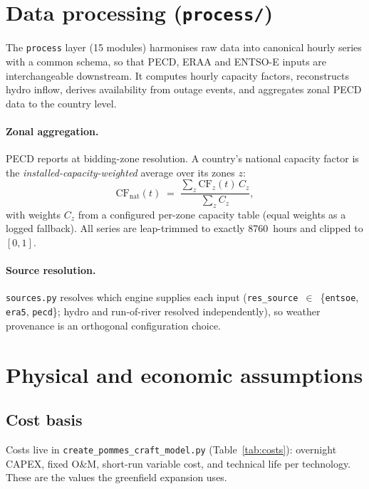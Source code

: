 \documentclass[11pt,a4paper]{article}
\begin{document}
\section{Data processing (\texttt{process/})}
The \texttt{process} layer (15 modules) harmonises raw data into canonical hourly series with a common
schema, so that PECD, ERAA and ENTSO-E inputs are interchangeable downstream. It computes hourly
capacity factors, reconstructs hydro inflow, derives availability from outage events, and aggregates
zonal PECD data to the country level.

\paragraph{Zonal aggregation.} PECD reports at bidding-zone resolution. A country's national capacity
factor is the \emph{installed-capacity-weighted} average over its zones $z$:
\begin{equation}
\mathrm{CF}_{\text{nat}}(t) \;=\; \frac{\sum_z \mathrm{CF}_z(t)\,C_z}{\sum_z C_z},
\label{eq:cf}
\end{equation}
with weights $C_z$ from a configured per-zone capacity table (equal weights as a logged fallback). All
series are leap-trimmed to exactly 8760~hours and clipped to $[0,1]$.

\paragraph{Source resolution.} \texttt{sources.py} resolves which engine supplies each input
(\texttt{res\_source}~$\in$~\{\texttt{entsoe}, \texttt{era5}, \texttt{pecd}\}; hydro and run-of-river
resolved independently), so weather provenance is an orthogonal configuration choice.

\section{Physical and economic assumptions}
\subsection{Cost basis}
Costs live in \texttt{create\_pommes\_craft\_model.py} (Table~\ref{tab:costs}): overnight CAPEX,
fixed O\&M, short-run variable cost, and technical life per technology. These are the values the
greenfield expansion uses.
\end{document}
